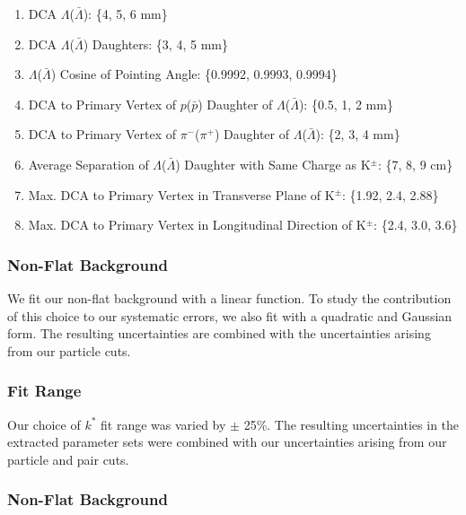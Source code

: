 \documentclass[ALICE,manyauthors]{cernphprep}
\begin{document}
\begin{enumerate}
 \item DCA $\Lambda$($\bar{\Lambda}$): \{4, 5, 6 mm\}
 \item DCA $\Lambda$($\bar{\Lambda}$) Daughters: \{3, 4, 5 mm\}
 \item $\Lambda$($\bar{\Lambda}$) Cosine of Pointing Angle: \{0.9992, 0.9993, 0.9994\}
 \item DCA to Primary Vertex of $p$($\bar{p}$) Daughter of $\Lambda$($\bar{\Lambda}$):  \{0.5, 1, 2 mm\}
 \item DCA to Primary Vertex of $\pi^{-}$($\pi^{+}$) Daughter of $\Lambda$($\bar{\Lambda}$):  \{2, 3, 4 mm\} 
 \item Average Separation of $\Lambda$($\bar{\Lambda}$) Daughter with Same Charge as K$^{\pm}$: \{7, 8, 9 cm\}
 \item Max. DCA to Primary Vertex in Transverse Plane of K$^{\pm}$: \{1.92, 2.4, 2.88\}
 \item Max. DCA to Primary Vertex in Longitudinal Direction of K$^{\pm}$: \{2.4, 3.0, 3.6\} 
\end{enumerate}


\subsubsection{Non-Flat Background}
\label{SysErrsLamKch:NonFlatBgd}

We fit our non-flat background with a linear function.  To study the contribution of this choice to our systematic errors, we also fit with a quadratic and Gaussian form. The resulting uncertainties are combined with the uncertainties arising from our particle cuts.

\subsubsection{Fit Range}
\label{SysErrsLamKch:FitRange}

Our choice of $k^{*}$ fit range was varied by $\pm$ 25\%.  The resulting uncertainties in the extracted parameter sets were combined with our uncertainties arising from our particle and pair cuts.









\subsubsection{Non-Flat Background}
\label{SysErrsLamK0:NonFlatBgd}
\end{document}
